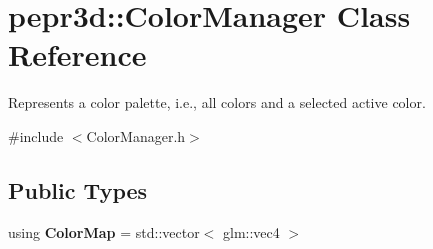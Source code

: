 \hypertarget{classpepr3d_1_1_color_manager}{}\section{pepr3d\+::Color\+Manager Class Reference}
\label{classpepr3d_1_1_color_manager}


Represents a color palette, i.\+e., all colors and a selected active color.  




{\ttfamily \#include $<$Color\+Manager.\+h$>$}

\subsection*{Public Types}
\begin{DoxyCompactItemize}
\item 
\mbox{\label{classpepr3d_1_1_color_manager_adc519f02303d002bbc80e731ef3937eb}} 
using {\bfseries Color\+Map} = std\+::vector$<$ glm\+::vec4 $>$
\end{DoxyCompactItemize}
